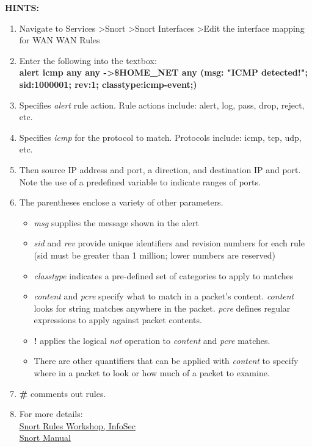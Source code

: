\documentclass[12pt]{extarticle}
\begin{document}
\vspace{8mm}
\noindent
\textbf{HINTS:}
\begin{enumerate}
    \item Navigate to Services \textgreater Snort \textgreater Snort Interfaces \textgreater Edit the interface mapping for WAN \text WAN Rules
    \item Enter the following into the textbox:\\
    \textbf{alert icmp any any -\textgreater \$HOME\_NET any (msg: "ICMP detected!"; sid:1000001; rev:1; classtype:icmp-event;)}
    \item Specifies \textit{alert} rule action. Rule actions include: alert, log, pass, drop, reject, etc.
    \item Specifies \textit{icmp} for the protocol to match. Protocols include: icmp, tcp, udp, etc.
    \item Then source IP address and port, a direction, and destination IP and port. Note the use of a predefined variable to indicate ranges of ports. 
    \item The parentheses enclose a variety of other parameters.\\
    \begin{itemize}
        \item \textit{msg} supplies the message shown in the alert
        \item \textit{sid} and \textit{rev} provide unique identifiers and revision numbers for each rule (sid must be greater than 1 million; lower numbers are reserved)
        \item \textit{classtype} indicates a pre-defined set of categories to apply to matches
        \item \textit{content} and \textit{pcre} specify what to match in a packet's content. \textit{content} looks for string matches anywhere in the packet. \textit{pcre} defines regular expressions to apply against packet contents.
        \item \textbf{!} applies the logical \textit{not} operation to \textit{content} and \textit{pcre} matches.
        \item There are other quantifiers that can be applied with \textit{content} to specify where in a packet to look or how much of a packet to examine.
    \end{itemize}
    \item \textbf{\#} comments out rules.
    \item For more details:\\
    \href{http://resources.infosecinstitute.com/snort-rules-workshop-part-one/#gref}{Snort Rules Workshop, InfoSec}\\
    \href{http://manual-snort-org.s3-website-us-east-1.amazonaws.com/node1.html}{Snort Manual}
    

\end{enumerate}
\end{document}
